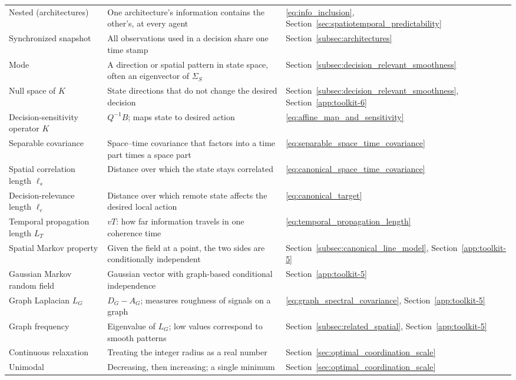 \begin{longtable}{@{}p{.23\linewidth}p{.52\linewidth}p{.20\linewidth}@{}}
Nested (architectures) & One architecture's information contains the other's, at every agent & \eqref{eq:info_inclusion}, Section~\ref{sec:spatiotemporal_predictability} \\
Synchronized snapshot & All observations used in a decision share one time stamp & Section~\ref{subsec:architectures} \\
Mode & A direction or spatial pattern in state space, often an eigenvector of $\Sigma_S$ & Section~\ref{subsec:decision_relevant_smoothness} \\
Null space of $K$ & State directions that do not change the desired decision & Section~\ref{subsec:decision_relevant_smoothness}, Section~\ref{app:toolkit-6} \\
Decision-sensitivity operator $K$ & $Q^{-1}B$; maps state to desired action & \eqref{eq:affine_map_and_sensitivity} \\
Separable covariance & Space--time covariance that factors into a time part times a space part & \eqref{eq:separable_space_time_covariance} \\
Spatial correlation length $\ell_s$ & Distance over which the state stays correlated & \eqref{eq:canonical_space_time_covariance} \\
Decision-relevance length $\ell_c$ & Distance over which remote state affects the desired local action & \eqref{eq:canonical_target} \\
Temporal propagation length $L_T$ & $vT$: how far information travels in one coherence time & \eqref{eq:temporal_propagation_length} \\
Spatial Markov property & Given the field at a point, the two sides are conditionally independent & Section~\ref{subsec:canonical_line_model}, Section~\ref{app:toolkit-5} \\
Gaussian Markov random field & Gaussian vector with graph-based conditional independence & Section~\ref{app:toolkit-5} \\
Graph Laplacian $L_G$ & $D_G-A_G$; measures roughness of signals on a graph & \eqref{eq:graph_spectral_covariance}, Section~\ref{app:toolkit-5} \\
Graph frequency & Eigenvalue of $L_G$; low values correspond to smooth patterns & Section~\ref{subsec:related_spatial}, Section~\ref{app:toolkit-5} \\
Continuous relaxation & Treating the integer radius as a real number & Section~\ref{sec:optimal_coordination_scale} \\
Unimodal & Decreasing, then increasing; a single minimum & Section~\ref{sec:optimal_coordination_scale} \\

\end{longtable}
